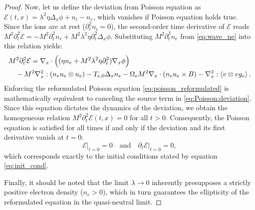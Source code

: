 \documentclass[10pt,a4paper]{amsart}
\newcommand{\Fabrice}[1]{#1}
\begin{document}
\begin{proof}
Now, let us define the deviation from Poisson equation as $\mathcal{E}(t,x) = \lambda^2 \eta \Delta_x \phi + n_i-n_e$, which vanishes if Poisson equation holds true. Since the ions are at rest ($\partial_t^2 n_i = 0$), the second-order time derivative of $\mathcal{E}$ reads $M^2 \partial_t^2 \mathcal{E} = -M^2 \partial_t^2 n_e + M^2 \lambda^2 \eta \partial_t^2 \Delta_x \phi$. Substituting $M^2 \partial_t^2 n_e$ from \eqref{eq:wave_ne} into this relation yields:
\begin{equation}\label{eq:Poisson:deviation}
    \begin{multlined}[0.9\textwidth]
    M^2\partial_t^2 \mathcal{E} = \nabla_x\cdot\Big((\Fabrice{\eta}n_e+M^2\lambda^2\eta\partial_t^2)\nabla_x\phi\Big) \\ - M^2\nabla_x^2:(n_eu_e\otimes u_e)-T_{e,0}\Fabrice{\Delta_x}n_e \Fabrice{ - \Omega_e M^2 \nabla_x \cdot (n_e u_e \times B )} - \nabla_x^2:\left< v\otimes vg_e \right>.
    \end{multlined}
\end{equation}
Enforcing the reformulated Poisson equation \eqref{eq:poisson_reformulated} is mathematically equivalent to canceling the source term in \eqref{eq:Poisson:deviation}. Since this equation dictates the dynamics of the deviation, we obtain the homogeneous relation $M^2 \partial_t^2 \mathcal{E}(t,x) = 0$ for all $t > 0$. Consequently, the Poisson equation is satisfied for all times if and only if the deviation and its first derivative vanish at $t = 0$:
\begin{equation*}
    \mathcal{E}\vert_{t=0} = 0 \quad \text{and} \quad \partial_t \mathcal{E}\vert_{t=0} = 0,
\end{equation*}
which corresponds exactly to the initial conditions stated by equation \eqref{eq:init_cond}. 

Finally, it should be noted that the limit $\lambda \to 0$ inherently presupposes a strictly positive electron density ($n_e > 0$), which in turn guarantees the ellipticity of the reformulated equation in the quasi-neutral limit.
\end{proof}
\end{document}
